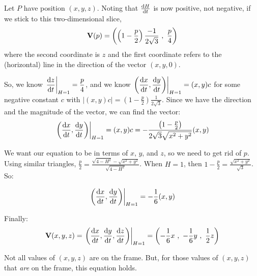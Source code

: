 \begin{solution}
\begin{enumerate}[a.]
Let $P$ have position $(x,y,z)$. Noting that $\diff{H}{t}$ is now positive, not negative, if we stick to this two-dimensional slice,
\[ \mathbf{V}(p)=\left( \left(1-\frac{p}{2}\right)\frac{-1}{2\sqrt{3}}~,~\frac{p}{4} \right) \] 
where the second coordinate is $z$ and the first coordinate refers to the (horizontal) line in the direction of the vector $(x,y,0)$.


\begin{center}
\end{center}

So, we know $\displaystyle\left.\diff{z}{t}\right|_{H=1}=\frac{p}{4}$, and we know $\displaystyle\left.\left(\diff{x}{t},\diff{y}{t}\right)\right|_{H=1}=(x,y)c$ for some negative constant $c$ with $|(x,y)c|=\left(1-\frac{p}{2}\right)\frac{1}{2\sqrt{3}}$. Since we have the direction and the magnitude of the vector, we can find the vector:
\[\left.\left( \diff{x}{t},\diff{y}{t}\right)\right|_{H=1}=(x,y)c=-\frac{\left(1-\frac{p}{2}\right)}{2\sqrt 3\sqrt{x^2+y^2}}(x,y)
\]

We want our equation to be in terms of $x$, $y$, and $z$, so we need to get rid of $p$.
Using similar triangles, $\frac{p}{2}=\frac{\sqrt{4-H^2}-\sqrt{x^2+y^2}}{\sqrt{4-H^2}}$. When $H=1$, then $1-\frac{p}{2}=\frac{\sqrt{x^2+y^2}}{\sqrt3}$. So:

\[\left.\left( \diff{x}{t},\diff{y}{t}\right)\right|_{H=1}
=-\frac{1}{6}(x,y)\]

Finally:
\[\vV(x,y,z)=\left.\left( \diff{x}{t},\diff{y}{t},\diff{z}{t}\right)\right|_{H=1}=\left(
-\frac{1}{6}x~,~
-\frac{1}{6}y~,~
\frac{1}{2}z\right)\]

Not all values of $(x,y,z)$ are on the frame. But, for those values of $(x,y,z)$ that \emph{are} on the frame, this equation holds.

\end{enumerate}
\end{solution}
